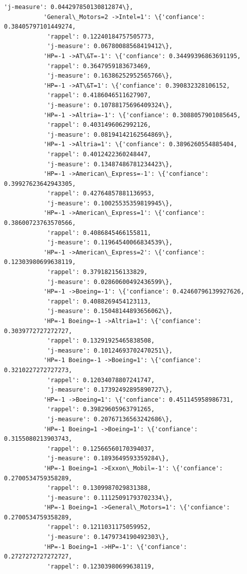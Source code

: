 \documentclass[11pt]{article}
\begin{document}
\begin{Verbatim}[commandchars=\\\{\}]
            'j-measure': 0.044297850130812874\},
           'General\_Motors=2 ->Intel=1': \{'confiance': 0.38405797101449274,
            'rappel': 0.12240184757505773,
            'j-measure': 0.06780088568419412\},
           'HP=-1 ->AT\&T=-1': \{'confiance': 0.34499396863691195,
            'rappel': 0.3647959183673469,
            'j-measure': 0.16386252952565766\},
           'HP=-1 ->AT\&T=1': \{'confiance': 0.390832328106152,
            'rappel': 0.4186046511627907,
            'j-measure': 0.10788175696409324\},
           'HP=-1 ->Altria=-1': \{'confiance': 0.3088057901085645,
            'rappel': 0.4031496062992126,
            'j-measure': 0.08194142162564869\},
           'HP=-1 ->Altria=1': \{'confiance': 0.3896260554885404,
            'rappel': 0.4012422360248447,
            'j-measure': 0.13487486781234423\},
           'HP=-1 ->American\_Express=-1': \{'confiance': 0.39927623642943305,
            'rappel': 0.42764857881136953,
            'j-measure': 0.10025535359819945\},
           'HP=-1 ->American\_Express=1': \{'confiance': 0.38600723763570566,
            'rappel': 0.4086845466155811,
            'j-measure': 0.11964540066834539\},
           'HP=-1 ->American\_Express=2': \{'confiance': 0.12303980699638119,
            'rappel': 0.379182156133829,
            'j-measure': 0.02860600492436599\},
           'HP=-1 ->Boeing=-1': \{'confiance': 0.42460796139927626,
            'rappel': 0.4088269454123113,
            'j-measure': 0.15048144893656062\},
           'HP=-1 Boeing=-1 ->Altria=1': \{'confiance': 0.3039772727272727,
            'rappel': 0.13291925465838508,
            'j-measure': 0.10124693702470251\},
           'HP=-1 Boeing=-1 ->Boeing=1': \{'confiance': 0.3210227272727273,
            'rappel': 0.12034078807241747,
            'j-measure': 0.17392492895890727\},
           'HP=-1 ->Boeing=1': \{'confiance': 0.451145958986731,
            'rappel': 0.39829605963791265,
            'j-measure': 0.20767136563242686\},
           'HP=-1 Boeing=1 ->Boeing=1': \{'confiance': 0.3155080213903743,
            'rappel': 0.12566560170394037,
            'j-measure': 0.1893649593359284\},
           'HP=-1 Boeing=1 ->Exxon\_Mobil=-1': \{'confiance': 0.2700534759358289,
            'rappel': 0.1309987029831388,
            'j-measure': 0.11125091793702334\},
           'HP=-1 Boeing=1 ->General\_Motors=1': \{'confiance': 0.2700534759358289,
            'rappel': 0.1211031175059952,
            'j-measure': 0.1479734190492303\},
           'HP=-1 Boeing=1 ->HP=-1': \{'confiance': 0.2727272727272727,
            'rappel': 0.12303980699638119,

\end{Verbatim}
\end{document}
